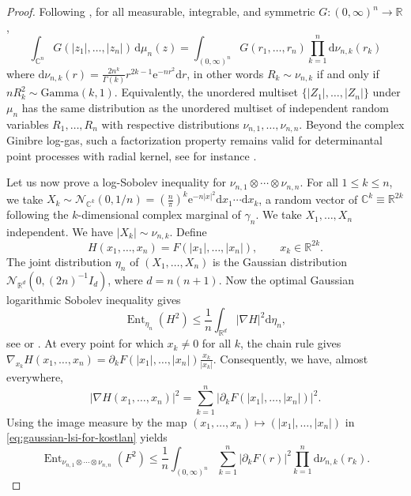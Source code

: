 \documentclass[11pt,reqno]{amsart}
\numberwithin{equation}{section}%
\numberwithin{figure}{section}%
\numberwithin{table}{section}
\theoremstyle{plain}
\theoremstyle{definition}
\begin{document}
\begin{proof}
  Following \cite{Kostlan}, for all measurable, integrable, and symmetric
  $G:(0,\infty)^n\to\mathbb{R}$,
  \begin{equation}\label{eq:kostlan-identity-radial-lsi}
    \int_{\mathbb{C}^n}G(|z_1|,\ldots,|z_n|)\,\mathrm{d}\mu_n(z)
    =
    \int_{(0,\infty)^n}G(r_1,\ldots,r_n)\prod_{k=1}^n\mathrm{d}\nu_{n,k}(r_k)
  \end{equation}
  where
  $\mathrm{d}\nu_{n,k}(r)=\frac{2n^k}{\Gamma(k)}r^{2k-1}\mathrm{e}^{-nr^2}\mathrm{d}r$,
  in other words $R_k\sim\nu_{n,k}$ if and only if
  $nR_k^2\sim\mathrm{Gamma}(k,1)$. Equivalently, the unordered multiset
  $\{|Z_1|,\ldots,|Z_n|\}$ under $\mu_n$ has the same distribution as the
  unordered multiset of independent random variables $R_1,\ldots,R_n$ with
  respective distributions $\nu_{n,1},\ldots,\nu_{n,n}$. Beyond the complex
  Ginibre log-gas, such a factorization property remains valid for
  determinantal point processes with radial kernel, see for instance
  \cite[Th.~26]{HoughKrishnapurPeresViragIndependence}.

  Let us now prove a log-Sobolev inequality for
  $\nu_{n,1}\otimes\cdots\otimes\nu_{n,n}$. For all $1\leq k\leq n$, we take
  $X_k\sim\mathcal{N}_{\mathbb{C}^k}(0,1/n)=(\frac{n}{\pi})^k\mathrm{e}^{-n|x|^2}\mathrm{d}x_1\cdots\mathrm{d}x_k$,
  a random vector of $\mathbb{C}^k\equiv\mathbb{R}^{2k}$ following the
  $k$-dimensional complex marginal of $\gamma_n$. We take $X_1,\ldots,X_n$
  independent. We have $|X_k|\sim\nu_{n,k}$. Define
  \[
    H(x_1,\ldots,x_n)
    =
    F(|x_1|,\ldots,|x_n|),
    \qquad
    x_k\in\mathbb{R}^{2k}.
  \]
  The joint distribution $\eta_n$ of $(X_1,\ldots,X_n)$ is the Gaussian
  distribution $\mathcal{N}_{\mathbb{R}^d}(0,(2n)^{-1}I_d)$, where $d=n(n+1)$.
  Now the optimal Gaussian logarithmic Sobolev inequality gives
  \begin{equation}\label{eq:gaussian-lsi-for-kostlan}
    \operatorname{Ent}_{\eta_n}(H^2)
    \leq
    \frac{1}{n}\int_{\mathbb{R}^d}|\nabla H|^2\mathrm{d}\eta_n,
  \end{equation}
  see \cite{Gross} or \cite[Ch.~5]{BakryGentilLedoux}. At every point for
  which $x_k\neq0$ for all $k$, the chain rule gives
  $\nabla_{x_k}H(x_1,\ldots,x_n)=\partial_kF(|x_1|,\ldots,|x_n|)\frac{x_k}{|x_k|}$.
  Consequently, we have, almost everywhere,
  \begin{equation}\label{eq:gaussian-block-gradient}
    |\nabla H(x_1,\ldots,x_n)|^2 = \sum_{k=1}^n|\partial_kF(|x_1|,\ldots,|x_n|)|^2.
  \end{equation}
  Using the image measure by the map
  $(x_1,\ldots,x_n)\mapsto(|x_1|,\ldots,|x_n|)$ in
  \eqref{eq:gaussian-lsi-for-kostlan} yields
  \begin{equation}\label{eq:kostlan-product-lsi}
    \operatorname{Ent}_{\nu_{n,1}\otimes\cdots\otimes\nu_{n,n}}(F^2)
    \leq
    \frac{1}{n}
    \int_{(0,\infty)^n}
    \sum_{k=1}^n|\partial_kF(r)|^2
    \prod_{k=1}^n\mathrm{d}\nu_{n,k}(r_k).
  \end{equation}


\end{proof}
\end{document}
